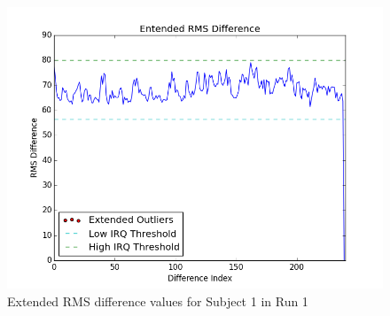\begin{figure}[h!]
\centering
\includegraphics[width=120mm]{images/extended_vol_rms_outliers.png}
\caption{Extended RMS difference values for Subject 1 in Run 1}
\label{fig:erms}
\end{figure}